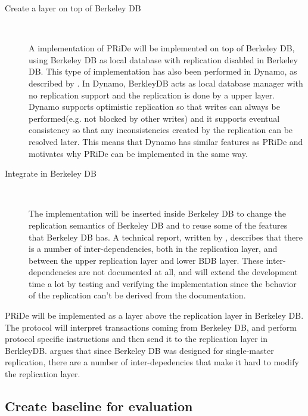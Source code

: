\begin{description}
 
\item[Create a layer on top of Berkeley DB] \
	
A implementation of PRiDe will be implemented on top of Berkeley DB, using Berkeley DB as local database with replication disabled in Berkeley DB. This type of implementation has also been performed in Dynamo, as described by \cite{Dynamo2007}. In Dynamo, BerkleyDB acts as local database manager with no replication support and the replication is done by a upper layer. Dynamo supports optimistic replication so that writes can always be performed(e.g. not blocked by other writes) and it supports eventual consistency so that any inconsistencies created by the replication can be resolved later. This means that Dynamo has similar features as PRiDe and motivates why PRiDe can be implemented in the same way.  
	
\item[Integrate in Berkeley DB] \

The implementation will be inserted inside Berkeley DB to change the replication semantics of Berkeley DB and to reuse some of the features that Berkeley DB has. A technical report, written by \cite{kang2008}, describes that there is a number of inter-dependencies, both in the replication layer, and between the upper replication layer and lower BDB layer. These inter-dependencies are not documented at all, and will extend the development time a lot by testing and verifying the implementation since the behavior of the replication can't be derived from the documentation.
 
\end{description}
   	
PRiDe will be implemented as a layer above the replication layer in Berkeley DB. The protocol will interpret transactions coming from  Berkeley DB, and perform protocol specific instructions and then send it to the replication layer in BerkleyDB. \cite{kang2008} argues that since Berkeley DB was designed for single-master replication, there are a number of inter-depedencies that make it hard to modify the replication layer.

\subsection{Create baseline for evaluation} %
\label{sub:extend_framework}

